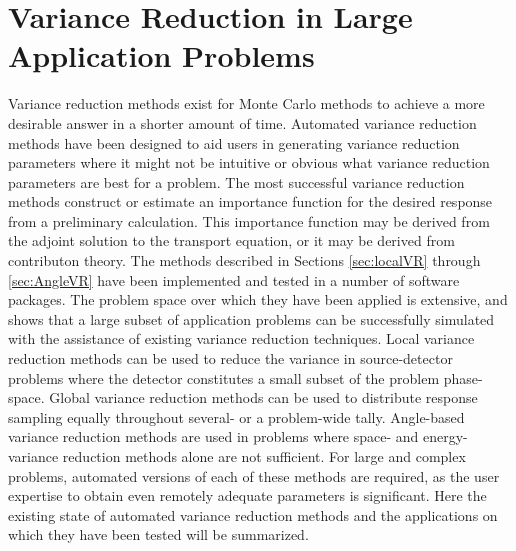 \section{Variance Reduction in Large Application Problems}
\label{sec:litsummary}

Variance reduction methods exist for Monte Carlo methods to
achieve a more desirable answer in a
shorter amount of time. Automated variance reduction methods have been designed
to aid users in generating variance reduction parameters where it might not be
intuitive or obvious what variance reduction parameters are best for a problem.
The most successful variance reduction methods construct or estimate an
importance function for the desired response from a preliminary calculation.
This importance function may be derived from the adjoint solution to the
transport equation, or it may be derived from contributon theory.
The methods described in Sections \ref{sec:localVR} through \ref{sec:AngleVR}
have been implemented and tested in a number of software packages. The problem
space over which they have been applied is extensive, and shows that a large
subset of application problems can be successfully simulated with the assistance
of existing variance reduction techniques. Local variance reduction methods can
be used to reduce the variance in source-detector problems where the detector
constitutes a small subset of the problem phase-space. Global variance reduction
methods can be used to distribute response sampling equally throughout several-
or a problem-wide tally. Angle-based variance reduction methods are used in
problems where space- and energy- variance reduction methods alone are not
sufficient. For large and complex problems, automated versions of each of these
methods are required, as the user expertise to obtain even remotely adequate
parameters is significant. Here the existing state of automated variance
reduction methods and the applications on which they have been tested will be
summarized.

